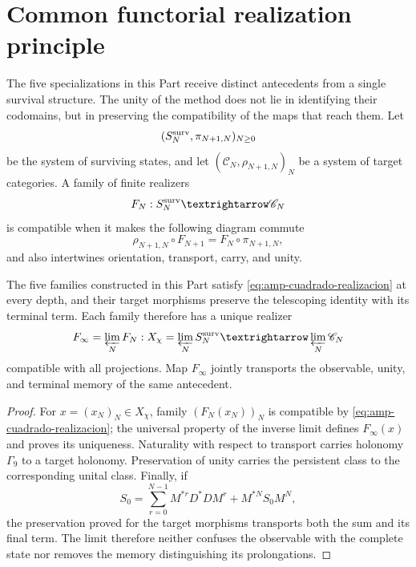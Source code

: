 \section*{Common functorial realization principle}
\label{sec:amp-principio-realizacion}

The five specializations in this Part receive distinct antecedents from a single survival structure. The unity of the method does not lie in identifying their codomains, but in preserving the compatibility of the maps that reach them. Let
\[
 (\mathcal S_N^{\rm surv},\pi_{N+1,N})_{N\geq0}
\]
be the system of surviving states, and let \((\mathscr C_N,\rho_{N+1,N})_N\) be a system of target categories. A family of finite realizers
\begin{equation}\label{eq:amp-realizadores-finitos}
 F_N:\mathcal S_N^{\rm surv}\longrightarrow\mathscr C_N
\end{equation}
is compatible when it makes the following diagram commute
\begin{equation}\label{eq:amp-cuadrado-realizacion}
 \rho_{N+1,N}\circ F_{N+1}
 =F_N\circ\pi_{N+1,N},
\end{equation}
and also intertwines orientation, transport, carry, and unity.

\begin{theorem}
\label{thm:amp-principio-realizacion}
The five families constructed in this Part satisfy \eqref{eq:amp-cuadrado-realizacion} at every depth, and their target morphisms preserve the telescoping identity with its terminal term. Each family therefore has a unique realizer
\begin{equation}\label{eq:amp-realizador-limite}
 F_\infty=\varprojlim_NF_N:
 X_\chi=\varprojlim_N\mathcal S_N^{\rm surv}
 \longrightarrow\varprojlim_N\mathscr C_N
\end{equation}
compatible with all projections. Map \(F_\infty\) jointly transports the observable, unity, and terminal memory of the same antecedent.
\end{theorem}

\begin{proof}
For \(x=(x_N)_N\in X_\chi\), family \((F_N(x_N))_N\) is compatible by \eqref{eq:amp-cuadrado-realizacion}; the universal property of the inverse limit defines \(F_\infty(x)\) and proves its uniqueness. Naturality with respect to transport carries holonomy \(\Gamma_9\) to a target holonomy. Preservation of unity carries the persistent class to the corresponding unital class. Finally, if
\[
 S_0=\sum_{r=0}^{N-1}M^{*r}D^*DM^r+M^{*N}S_0M^N,
\]
the preservation proved for the target morphisms transports both the sum and its final term. The limit therefore neither confuses the observable with the complete state nor removes the memory distinguishing its prolongations.
\end{proof}

